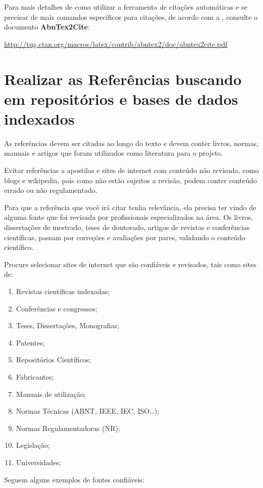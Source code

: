  Para mais detalhes de como utilizar a ferramenta de citações automáticas e se precisar de mais comandos específicos para citações, de acordo com a , consulte o documento {\bf AbnTex2Cite}:

 \url{http://tug.ctan.org/macros/latex/contrib/abntex2/doc/abntex2cite.pdf}


\section{Realizar as Referências buscando em repositórios e bases de dados indexados}

As referências devem ser citadas ao longo do texto e devem conter livros, normas, manuais e artigos que foram utilizados como literatura para o projeto.
    
Evitar referências a apostilas e sites de internet com conteúdo não revisado, como blogs e wikipedia, pois como não estão sujeitos a revisão, podem conter conteúdo errado ou não regulamentado.

Para que a referência que você irá citar tenha relevância, ela precisa ter vindo de alguma fonte que foi revisada por profissionais especializados na área. Os livros, dissertações de mestrado, teses de doutorado, artigos de revistas e conferências científicas, passam por correções e avaliações por pares, validando o conteúdo científico.  
    
Procure selecionar sites de internet que são confiáveis e revisados, tais como sites de:

\begin{enumerate}
    \item Revistas científicas indexadas;
    \item Conferências e congressos;
    \item Teses, Dissertações, Monografias;
    \item Patentes;
    \item Repositórios Científicos;
    \item Fabricantes;
    \item Manuais de utilização;
    \item Normas Técnicas (ABNT, IEEE, IEC, ISO\ldots);
    \item Normas Regulamentadoras (NR);  
    \item Legislação;
    \item Universidades;
\end{enumerate}

Seguem alguns exemplos de fontes confiáveis:

